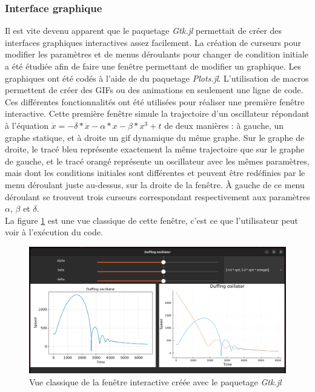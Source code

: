 \documentclass[a4paper, french, 12pt, titlepage]{article}
\begin{document}
\subsubsection{Interface graphique}

Il est vite devenu apparent que le paquetage \emph{Gtk.jl} permettait de créer des interfaces graphiques interactives assez facilement.
 La création de curseurs pour modifier les paramètres et de menus déroulants pour changer de condition initiale a été étudiée afin de faire une fenêtre permettant de modifier un graphique.
  Les graphiques ont été codés à l'aide de du paquetage \emph{Plots.jl}.
   L'utilisation de macros permettent de créer des GIFs ou des animations en seulement une ligne de code. 
   Ces différentes fonctionnalités ont été utilisées pour réaliser une première fenêtre interactive. 
   Cette première fenêtre simule la trajectoire d'un oscillateur répondant à l'équation $\ddot x = - \delta * \dot x - \alpha * x - \beta * x^3 + t $ de deux manières : à gauche, un graphe statique, et à droite un gif dynamique du même graphe. 
   Sur le graphe de droite, le tracé bleu représente exactement la même trajectoire que sur le graphe de gauche, et le tracé orangé représente un oscillateur avec les mêmes paramètres, mais dont les conditions initiales sont différentes et peuvent être redéfinies par le menu déroulant juste au-dessus, sur la droite de la fenêtre. 
   À gauche de ce menu déroulant se trouvent trois curseurs correspondant respectivement aux paramètres $\alpha$, $\beta$ et $\delta$. \\

La figure \ref{fig:interactive1} est une vue classique de cette fenêtre, c'est ce que l'utilisateur peut voir à l'exécution du code.\\

\begin{figure}[H]
  \includegraphics[width=\linewidth]{interactivewindow_1.png}
  \caption{Vue classique de la fenêtre interactive créée avec le paquetage \emph{Gtk.jl}}
  	\label{fig:interactive1}
\end{figure}
\end{document}
